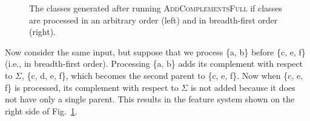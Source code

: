 \documentclass[12pt, oneside]{article}   	%
\begin{document}
\begin{figure}[htb!]
	\centering
	\qquad
	\caption{The classes generated after running \textsc{AddComplementsFull} if classes are processed in an arbitrary order (left) and in breadth-first order (right).}
	\label{fig:bfsfeats}
\end{figure}


Now consider the same input, but suppose that we process \{a, b\} before \{c, e, f\} (i.e., in breadth-first order). Processing \{a, b\} adds its complement with respect to $\Sigma$, \{c, d, e, f\}, which becomes the second parent to \{c, e, f\}. Now when \{c, e, f\} is processed, its complement with respect to $\Sigma$ is not added because it does not have only a single parent. This results in the feature system shown on the right side of Fig.~\ref{fig:bfsfeats}.

\end{document}
